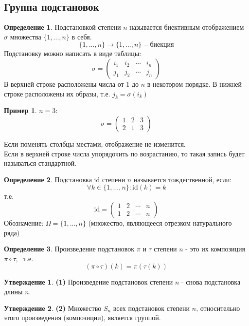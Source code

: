 \documentclass[a4paper, 12pt]{article}
\theoremstyle{definition}
\newtheorem*{definition}{Определение}
\newtheorem*{subtheorem}{Утверждение}
\newtheorem*{example1}{Пример}
\begin{document}
  \subsection{Группа подстановок}
  \begin{definition}
    Подстановкой степени $n$ называется биективным отображением $\sigma$ множества $\{1,...,n\}$ в себя. 
    $$\{1,...,n\} \to \{1,...,n\} - \text{биекция}$$  
    Подстановку можно написать в виде таблицы:
    $$\sigma = \begin{pmatrix}
      i_1 & i_2 & \cdots & i_n \\
      j_1 & j_2 & \cdots & j_n
    \end{pmatrix}$$ 
    В верхней строке расположены числа от 1 до $n$ в некотором порядке. В нижней строке расположены их образы, т.е. $j_k = \sigma(i_k)$ 
    \begin{example1}
      $n=3:$ $$\sigma=\begin{pmatrix}
        1 & 2 & 3 \\
        2 & 1 & 3
      \end{pmatrix}$$  
    \end{example1}
    Если поменять столбцы местами, отображение не изменится. \\
    Если в верхней строке числа упорядочить по возрастанию, то такая запись будет называться стандартной.
  \end{definition} 
  \begin{definition}
    Подстановка $\textrm{id}$ степени $n$ называется тождественной, если:
    $$\forall k \in \{1,...,n\}: \textrm{id}(k) = k$$ 
    т.е. $$\textrm{id} = \begin{pmatrix}
      1 & 2 & \cdots & n \\
      1 & 2 & \cdots & n
    \end{pmatrix}$$  
    Обозначение: $\Omega = \{1,...,n\}$ (множество, являющееся отрезком натурального ряда)
  \end{definition} 
  \begin{definition}
    Произведение подстановок $\pi$ и $\tau$ степени $n$ - это их композиция $\pi \circ \tau$, \ т.е. $$(\pi \circ \tau)(k)= \pi(\tau(k))$$  
  \end{definition} 
  \begin{subtheorem}\textbf{(1)} 
    Произведение подстановок степени $n$ - снова подстановка длины $n$. 
  \end{subtheorem} 
  \begin{subtheorem}\textbf{(2)}
    Множество $S_n$ всех подстановок степени $n$, относительно этого произведения (композиции), является группой. 
  \end{subtheorem} 
\end{document}
